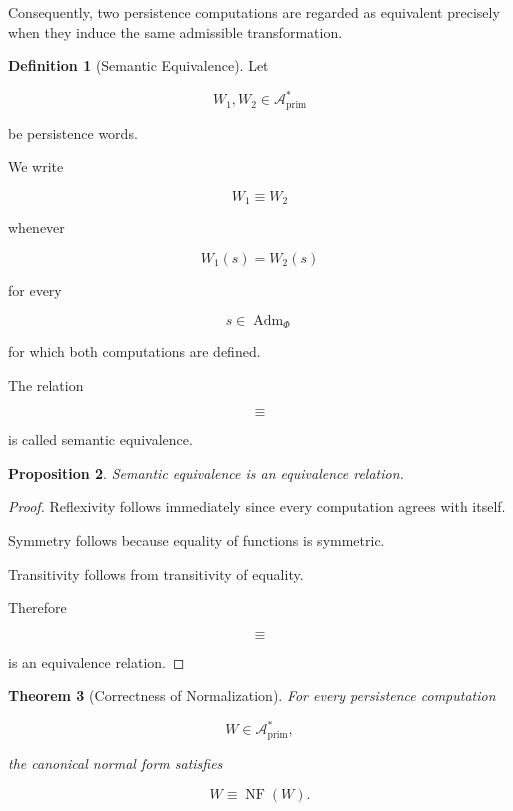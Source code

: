 \documentclass[11pt]{book}
\numberwithin{equation}{chapter}
\theoremstyle{definition}
\newtheorem{definition}{Definition}[chapter]
\theoremstyle{plain}
\newtheorem{theorem}[definition]{Theorem}
\newtheorem{proposition}[definition]{Proposition}
\begin{document}
Consequently, two persistence computations are regarded as equivalent
precisely when they induce the same admissible transformation.

\begin{definition}[Semantic Equivalence]

Let

\[
W_1,W_2
\in
\mathcal A_{\mathrm{prim}}^*
\]

be persistence words.

We write

\[
W_1
\equiv
W_2
\]

whenever

\[
W_1(s)
=
W_2(s)
\]

for every

\[
s
\in
\operatorname{Adm}_{\Phi}
\]

for which both computations are defined.

The relation

\[
\equiv
\]

is called semantic equivalence.

\end{definition}

\begin{proposition}

Semantic equivalence is an equivalence relation.

\end{proposition}

\begin{proof}

Reflexivity follows immediately since every computation agrees with
itself.

Symmetry follows because equality of functions is symmetric.

Transitivity follows from transitivity of equality.

Therefore

\[
\equiv
\]

is an equivalence relation.

\end{proof}

\begin{theorem}[Correctness of Normalization]

For every persistence computation

\[
W
\in
\mathcal A_{\mathrm{prim}}^*,
\]

the canonical normal form satisfies

\[
W
\equiv
\operatorname{NF}(W).
\]

\end{theorem}
\end{document}
